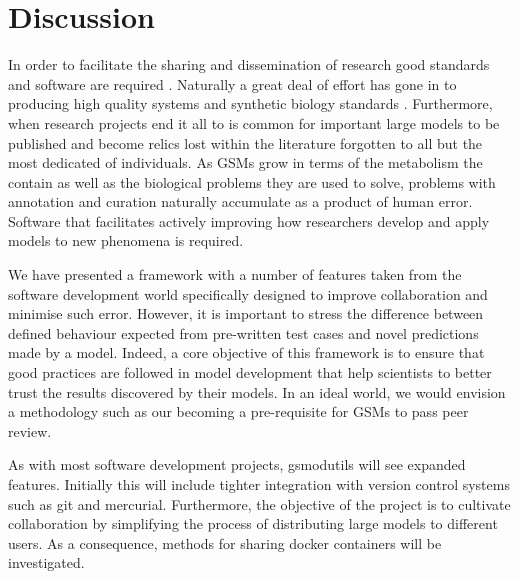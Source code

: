 \documentclass[a4paper,10pt]{article}
\begin{document}
\section{Discussion}
In order to facilitate the sharing and dissemination of research good standards and software are required \cite{}.
Naturally a great deal of effort has gone in to producing high quality systems and synthetic biology standards \cite{}.
Furthermore, when research projects end it all to is common for important large models to be published and become relics lost within the literature forgotten to all but the most dedicated of individuals.
As GSMs grow in terms of the metabolism the contain as well as the biological problems they are used to solve, problems with annotation and curation naturally accumulate as a product of human error.
Software that facilitates actively improving how researchers develop and apply models to new phenomena is required.

We have presented a framework with a number of features taken from the software development world specifically designed to improve collaboration and minimise such error.
However, it is important to stress the difference between defined behaviour expected from pre-written test cases and novel predictions made by a model.
Indeed, a core objective of this framework is to ensure that good practices are followed in model development that help scientists to better trust the results discovered by their models.
In an ideal world, we would envision a methodology such as our becoming a pre-requisite for GSMs to pass peer review.


As with most software development projects, gsmodutils will see expanded features.
Initially this will include tighter integration with version control systems such as git and mercurial.
Furthermore, the objective of the project is to cultivate collaboration by simplifying the process of distributing large models to different users.
As a consequence, methods for sharing docker containers will be investigated.
\end{document}
